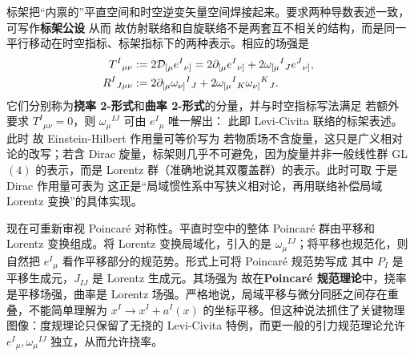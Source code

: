 标架把“内禀的”平直空间和时空逆变矢量空间焊接起来。要求两种导数表述一致，可写作\textbf{标架公设}
从而
故仿射联络和自旋联络不是两套互不相关的结构，而是同一平行移动在时空指标、标架指标下的两种表示。相应的场强是
\begin{align}
    T^I{}_{\mu\nu}&:=2\mathcal D_{[\mu}e^I{}_{\nu]}
    =2\partial_{[\mu}e^I{}_{\nu]}+2\omega_{[\mu}{}^I{}_J e^J{}_{\nu]},\\
    R^I{}_{J\mu\nu}&:=2\partial_{[\mu}\omega_{\nu]}{}^I{}_J
    +2\omega_{[\mu}{}^I{}_K\omega_{\nu]}{}^K{}_J.
\end{align}
它们分别称为\textbf{挠率 2-形式}和\textbf{曲率 2-形式}的分量，并与时空指标写法满足
若额外要求 $T^I{}_{\mu\nu}=0$，则 $\omega_\mu{}^{IJ}$ 可由 $e^I{}_\mu$ 唯一解出：
此即 Levi-Civita 联络的标架表述。此时
故 Einstein-Hilbert 作用量可等价写为
若物质场不含旋量，这只是广义相对论的改写；若含 Dirac 旋量，标架则几乎不可避免，因为旋量并非一般线性群 GL$(4)$ 的表示，而是 Lorentz 群（准确地说其双覆盖群）的表示。此时可取
于是 Dirac 作用量可表为
这正是“局域惯性系中写狭义相对论，再用联络补偿局域 Lorentz 变换”的具体实现。

现在可重新审视 Poincaré 对称性。平直时空中的整体 Poincaré 群由平移和 Lorentz 变换组成。将 Lorentz 变换局域化，引入的是 $\omega_\mu{}^{IJ}$；将平移也规范化，则自然把 $e^I{}_\mu$ 看作平移部分的规范势。形式上可将 Poincaré 规范势写成
其中 $P_I$ 是平移生成元，$J_{IJ}$ 是 Lorentz 生成元。其场强为
故在\textbf{Poincaré 规范理论}中，挠率是平移场强，曲率是 Lorentz 场强。严格地说，局域平移与微分同胚之间存在重叠，不能简单理解为 $x^I\to x^I+a^I(x)$ 的坐标平移。但这种说法抓住了关键物理图像：度规理论只保留了无挠的 Levi-Civita 特例，而更一般的引力规范理论允许 $e^I{}_\mu,\omega_\mu{}^{IJ}$ 独立，从而允许挠率。

